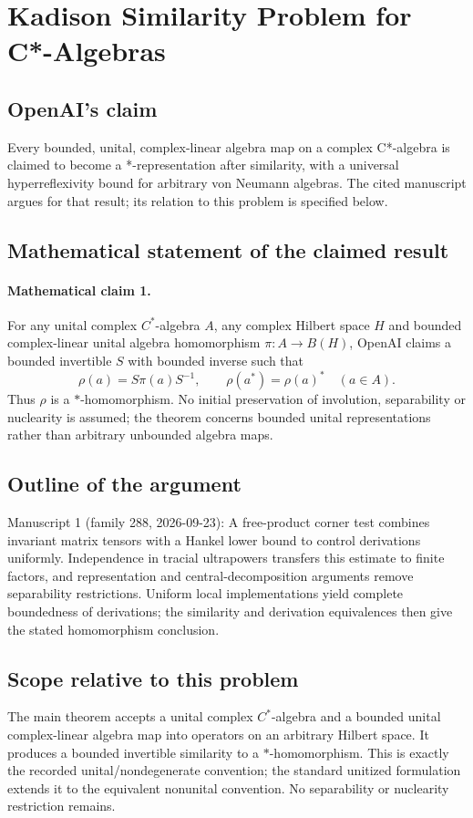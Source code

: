 \documentclass[11pt]{article}
\begin{document}
\section*{Kadison Similarity Problem for C*-Algebras}

\subsection{OpenAI's claim}
Every bounded, unital, complex-linear algebra map on a complex C*-algebra is claimed to become a *-representation after similarity, with a universal hyperreflexivity bound for arbitrary von Neumann algebras. The cited manuscript argues for that result; its relation to this problem is specified below.

\subsection{Mathematical statement of the claimed result}
\paragraph{Mathematical claim 1.} For any unital complex $C^*$-algebra $A$, any complex Hilbert space $H$ and bounded complex-linear unital algebra homomorphism $\pi:A\to B(H)$, OpenAI claims a bounded invertible $S$ with bounded inverse such that
\[
\rho(a)=S\pi(a)S^{-1},\qquad\rho(a^*)=\rho(a)^*\quad(a\in A).
\]
Thus $\rho$ is a $*$-homomorphism. No initial preservation of involution, separability or nuclearity is assumed; the theorem concerns bounded unital representations rather than arbitrary unbounded algebra maps.

\subsection{Outline of the argument}
Manuscript 1 (family 288, 2026-09-23): A free-product corner test combines invariant matrix tensors with a Hankel lower bound to control derivations uniformly. Independence in tracial ultrapowers transfers this estimate to finite factors, and representation and central-decomposition arguments remove separability restrictions. Uniform local implementations yield complete boundedness of derivations; the similarity and derivation equivalences then give the stated homomorphism conclusion.

\subsection{Scope relative to this problem}
The main theorem accepts a unital complex $C^*$-algebra and a bounded unital complex-linear algebra map into operators on an arbitrary Hilbert space. It produces a bounded invertible similarity to a $*$-homomorphism. This is exactly the recorded unital/nondegenerate convention; the standard unitized formulation extends it to the equivalent nonunital convention. No separability or nuclearity restriction remains.
\end{document}
